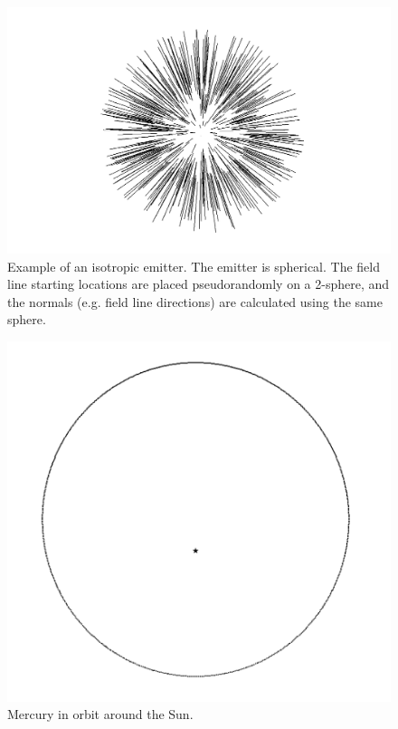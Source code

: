 \documentclass[12pt]{article}
\begin{document}
\pagebreak


\begin{figure} 
\centering
  \includegraphics[width = 4 in]{3.png}
  \caption{
Example of an isotropic emitter.
The emitter is spherical.
The field line starting locations are placed pseudorandomly on a 2-sphere, and the normals (e.g. field line directions) are calculated using the same sphere.
}
\end{figure}


\begin{figure} 
\centering
  \includegraphics[width = 4 in]{mercury.png}
  \caption{
Mercury in orbit around the Sun.
}
\end{figure}
\end{document}
